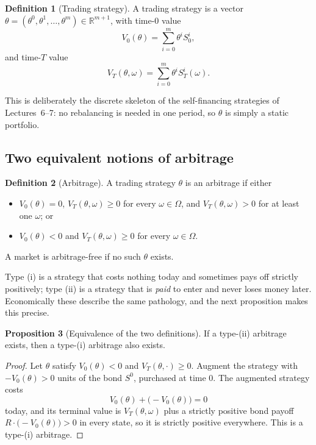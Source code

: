 \documentclass[10pt]{article}
\newcommand{\R}{\mathbb R}
\newcommand{\1}{\mathbf 1}
\theoremstyle{definition}
\newtheorem{definition}{Definition}[section]
\newtheorem{proposition}[definition]{Proposition}
\begin{document}
\begin{definition}[Trading strategy]
A trading strategy is a vector \(\theta=(\theta^0,\theta^1,\ldots,\theta^m)\in\R^{m+1}\),
with time-\(0\) value
\[
V_0(\theta)=\sum_{i=0}^m\theta^iS_0^i,
\]
and time-\(T\) value
\[
V_T(\theta,\omega)=\sum_{i=0}^m\theta^iS_T^i(\omega).
\]
\end{definition}

This is deliberately the discrete skeleton of the self-financing strategies
of Lectures~6--7: no rebalancing is needed in one period, so \(\theta\) is
simply a static portfolio.

\subsection{Two equivalent notions of arbitrage}

\begin{definition}[Arbitrage]
A trading strategy \(\theta\) is an arbitrage if either
\begin{itemize}
  \item[(i)] \(V_0(\theta)=0\), \(V_T(\theta,\omega)\geq0\) for every
        \(\omega\in\Omega\), and \(V_T(\theta,\omega)>0\) for at least one
        \(\omega\); or
  \item[(ii)] \(V_0(\theta)<0\) and \(V_T(\theta,\omega)\geq0\) for every
        \(\omega\in\Omega\).
\end{itemize}
A market is arbitrage-free if no such \(\theta\) exists.
\end{definition}

Type (i) is a strategy that costs nothing today and sometimes pays off
strictly positively; type (ii) is a strategy that is \emph{paid} to enter and
never loses money later. Economically these describe the same pathology, and
the next proposition makes this precise.

\begin{proposition}[Equivalence of the two definitions]
If a type-(ii) arbitrage exists, then a type-(i) arbitrage also exists.
\end{proposition}

\begin{proof}
Let \(\theta\) satisfy \(V_0(\theta)<0\) and \(V_T(\theta,\cdot)\geq0\).
Augment the strategy with \(-V_0(\theta)>0\) units of the bond \(S^0\),
purchased at time \(0\). The augmented strategy costs
\[
V_0(\theta)+\bigl(-V_0(\theta)\bigr)=0
\]
today, and its terminal value is \(V_T(\theta,\omega)\) plus a strictly
positive bond payoff \(R\cdot\bigl(-V_0(\theta)\bigr)>0\) in every state, so
it is strictly positive everywhere. This is a type-(i) arbitrage.
\end{proof}
\end{document}
